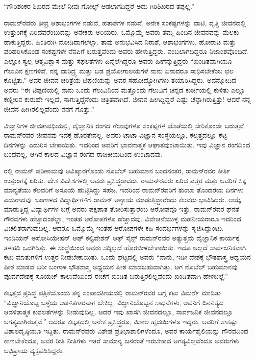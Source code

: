 “ಗೌರಿಶಂಕರ ಶಿಖರದ ಮೇಲೆ ನೀವು ಗೋಲ್ಫ್ ಆಡಲಾಗದಿದ್ದರೆ ಅದು ಗಿರಿಶಿಖರದ ತಪ್ಪಲ್ಲ.”

ರಾಮನ್‍ರವರು ತೀವ್ರ ಆಶಾಭಂಗಗಳ ನಡುವೆ, ಹತಾಶೆಗಳ ನಡುವೆ, ಅನೇಕ ಸಂಕಷ್ಟಗಳನ್ನು ದಾಟಿ, ವೃತ್ತಿ ಜೀವನದಲ್ಲಿ ಉತ್ತುಂಗಕ್ಕೆ ಏರಿದವರೆಂಬುದನ್ನು ಅನೇಕರು ಅರಿಯರು. ಒಮ್ಮೊಮ್ಮೆ ಅವರು ತಮ್ಮ ಹಿಂದಿನ ಜೀವನವನ್ನು ಮೆಲಕು ಹಾಕುತ್ತಿದ್ದರು. ಹಿಂತಿರುಗಿ ನೋಡಿದಾಗಲೆಲ್ಲಾ, ತಾವು ಅನುಭವಿಸಿದ ನಿರಾಶೆ, ಆಶಾಭಂಗಗಳು, ಹೋರಾಟ ಮತ್ತು ಪರಿಹರಿಸಿಕೊಂಡ ಸಂಕಷ್ಟಗಳೇ ನೆನಪಿಗೆ ಬರುತ್ತವೆಂದು ಅವರು ಹೇಳುತ್ತಿದ್ದರು. ನಂಬಲಾಗದಿದ್ದರೂ ನಿಜಾಂಶವೊಂದಿದೆ. ಎಲ್ಲೋ ಸ್ವಲ್ಪ ಆತ್ಮವಿಶ್ವಾಸ ಮತ್ತು ಸಫಲತೆಗಳು ಹಿನ್ನೆಲೆಗಿದ್ದರೂ ಅವರು ಹೀಗೆನ್ನುತ್ತಿದ್ದರು\enginline{-} “ಖಂಡಿತವಾಗಿಯೂ ಗೆಲುವಿನ ಕ್ಷಣಗಳಿವೆ. ನನ್ನ ದಾರಿದ್ರ್ಯ ಮತ್ತು ಬಡ ಪ್ರಯೋಗಾಲಯಗಳೆ ನಾನು ಏನಾದರೂ ಸಾಧಿಸಬೇಕೆಂಬ ಛಲ ಕೊಟ್ಟಿತು.” ಅವರ ಜೀವನ ಚರಿತ್ರೆಯ ಟಿಪ್ಪಣಿಯನ್ನು ಅವರ ಸಹೋದ್ಯೋಗಿ\-ಗಳು ತಯಾರಿಸಿದ್ದರು. ಅದನ್ನೋದಿದ ಅವರು “ಈ ಟಿಪ್ಪಣಿಯಲ್ಲಿ ನಾನು ಒಂದು ಗೆಲುವಿನಿಂದ ಮತ್ತೊಂದು ಗೆಲುವಿಗೆ ಚಿನ್ನದ ಕುರ್ಚಿಯಲ್ಲಿ ಕುಳಿತು ಎಲ್ಲೂ ಕಣ್ಣೀರಿನ ಕುರುಹೇ ಇಲ್ಲದೆ, ಸಾಗುತ್ತಿದ್ದೆ\-ನೆಂದು ಚಿತ್ರಿತವಾಗಿದೆ. ಜೀವನ ಹೀಗಿದ್ದಿದ್ದರೆ ಎಷ್ಟು ಚೆನ್ನಾಗಿರುತ್ತಿತ್ತು! ಆದರೆ ನನ್ನ ಜೀವನ ಹೀಗಿರಲಿಲ್ಲವೆಂದು ನನಗೆ ಗೊತ್ತು.”

ವಿಜ್ಞಾನಿಗಳ ಜೀವತಾವಧಿಯಲ್ಲಿ, ವೈಜ್ಞಾನಿಕ ರಂಗದ ಗೆಲುವುಗಳೂ ಸಂಕಷ್ಟಗಳ ಜೊತೆಯಲ್ಲಿ ಸೇರಿಕೊಂಡೇ ಬರುತ್ತವೆ. ರಾಮನ್‍ರವರ ಜೀವನವು ಇದಕ್ಕೆ ಹೊರತೇನಲ್ಲ. ಅವರು ಟಾಟಾ ವಿಜ್ಞಾನ ಸಂಸ್ಥೆಯಲ್ಲೂ, ಕಲ್ಕತ್ತದಲ್ಲೂ ಕೆಟ್ಟ ದಿನಗಳನ್ನು ಎದುರಿಸ ಬೇಕಾಯಿತು. ಇದರಿಂದ ಅವರಿಗೆ ಭಾವನಾತ್ಮಕ ಆಘಾತವುಂಟಾಯಿತು. ಇವು ವಿಜ್ಞಾನ ರಂಗದಿಂದ ಬಂದವಲ್ಲ, ಆಗಿನ ಕಾಲದ ವಿಜ್ಞಾನ ರಂಗದ ರಾಜಕೀಯದಿಂದ ಉಂಟಾದವು.

ರಲ್ಲಿ ರಾಮನ್ ಪರಿಣಾಮವು ಆವಿಷ್ಕಾರಗೊಂಡು ನೊಬೆಲ್ ಬಹುಮಾನ ಬಂದನಂತರ, ರಾಮನ್‍ರವರ ಕೀರ್ತಿ ಉತ್ತುಂಗಕ್ಕೆ ಏರಿತು. ದೇಶ ವಿದೇಶಗಳಲ್ಲಿ ಅವರು ಪ್ರಸಿದ್ಧರಾದರು. ರಾಮನ್‍ರವರು ಏರಿದ ಎತ್ತರ ಮತ್ತು ಅವರಿಗೆ ಸಿಕ್ಕ ಮಾನ್ಯತೆಯು ಕೆಲವರಿಗೆ ಅಸೂಯೆ ಹುಟ್ಟಿಸಿದ್ದು ಸಹಜ. ಇದರಿಂದ ರಾಮನ್‍ರವರಿಗೆ ತುಂಬಾ ತೊಂದರೆಯ ದಿನಗಳು ಎದುರಾದವು. ಬಂಗಾಳದ ವಿದ್ಯಾರ್ಥಿಗಳಿಗೆ ರಾಮನ್ ಅನ್ಯಾಯ ಮಾಡುತ್ತಿದ್ದಾರೆಂದು ಕೆಲವರು ಭಾವಿಸಿದರು. ಆಯ್ಕೆ ಮಾಡುತ್ತಿದ್ದ ವಿದ್ಯಾರ್ಥಿಗಳ ಬಗ್ಗೆ ಅವರು ಪಕ್ಷಪಾತ ತೋರಿಸುತ್ತಾರೆಂಬ ಆರೋಪವೂ ಇತ್ತು. ರಾಮನ್‍ರವರ ಘನತೆ ಗೌರವಗಳು ಹೆಚ್ಚಾದಂತೆಲ್ಲಾ, ಇಂತಹ ಆರೋಪಗಳೂ ಹೆಚ್ಚಾದವು. ವಿವೇಚನೆ\-ಯುಳ್ಳ ಮಹನೀಯರಾರೂ ಇದರಿಂದ ವಿಚಲಿತರಾಗುವುದಿಲ್ಲ. ಆದರೂ ಒಮ್ಮೊಮ್ಮೆ ಇಂತಹ ಆರೋಪಗಳೇ ಕಹಿ ಸಂದರ್ಭಗಳನ್ನು ಸೃಜಿಸಿದ್ದುಂಟು. ಇಂಡಿಯನ್ ಅಸೋಸಿಯೇಷನ್ ಆಫ್ ಕಲ್ಟಿವೇಶನ್ ಆಫ್ ಸೈನ್ಸ್ ರಾಮನ್‍ರವರ ಅತ್ಯುತ್ತಮ ವೈಜ್ಞಾನಿಕ ಕಾರ್ಯಕ್ಕೆ ತಳಹದಿ ಒದಗಿಸಿತ್ತು. ಈ ಸಂಸ್ಥೆಯಿಂದ ಅವರು ಸದ್ದಿಲ್ಲದೆ ಹೊರಬೀಳಬೇಕಾಯಿತು. ಇದೂ ಅಲ್ಲದೆ ಸಾರ್ವಜನಿಕವಾಗಿ ಕಟು ಮಾತುಗಳಿಗೆ ಉತ್ತರ ನೀಡಬೇಕಾಯಿತು. ಒಂದು ಘಟ್ಟದಲ್ಲಿ ಅವರು “ನಾನು, ಇಡೀ ದೇಶಕ್ಕೆ ಭೌತಶಾಸ್ತ್ರ ಅಧ್ಯಯನ ಪೀಠ ಮಾಡದೆ ಬರೀ ಬಂಗಾಳ ಭೌತಶಾಸ್ತ್ರ ಅಧ್ಯಯನ ಪೀಠ ಮಾಡಬಹುದಾಗಿತ್ತು. ಆಗ ನೊಬೆಲ್ ಬಹುಮಾನವು ಪೂರ್ವದೇಶಕ್ಕೆ ಸೂಯಜ್ ಕಾಲುವೆಯಿಂದ ಈಚೆಗೆ ಖಂಡಿತ ಬರುತ್ತಿರಲಿಲ್ಲವೆಂದು ಖಂಡಿತವಾಗಿ ಹೇಳಬಲ್ಲೆ.”

ಕಲ್ಕತ್ತದ ಪ್ರಸಿದ್ಧ ಪತ್ರಿಕೆಯೊಂದು ತನ್ನ ಸಂಪಾದಕೀಯದಲ್ಲಿ ರಾಮನ್‍ರವರ ಬಗ್ಗೆ ಕಟು ವಿಮರ್ಶೆ ಮಾಡಿತು\enginline{-} “ವಿಜ್ಞಾನಿಯೊಬ್ಬ ಒಳ್ಳೆಯ ಆಡಳಿತಗಾರನಾಗ ಬೇಕಿಲ್ಲ. ವಿಜ್ಞಾನಿಯೊಬ್ಬನ ಸಾಧನೆಗಳು, ಅವನಿಗೆ ದಿನನಿತ್ಯದ ಆಡಳಿತಾತ್ಮಕ ಕುಶಲತೆಗಳನ್ನು ನೀಡುವುದಿಲ್ಲ. ಆದರೆ ಇವು ಖಾಸಗಿ ಜೀವನದಲ್ಲೂ, ಸಾರ್ವಜನಿಕ ಜೀವನದಲ್ಲೂ ಅಗತ್ಯವಾಗಿರುತ್ತವೆ.” ಆದರೂ ಕಲ್ಕತ್ತದಲ್ಲಿ ಅನೇಕ ಪ್ರಸಿದ್ಧರೂ, ವಿಶಾಲ ಹೃದಯಿಗಳೂ ಇದ್ದರು. ಅವರಿಗೆ ಸಾಕಷ್ಟು ವಿಶಾಲದೃಷ್ಠಿಯೂ ಇದ್ದಿತು. ರಾಮನ್‍ರವರು ವಿಶೇಷ ಪ್ರತಿಭಾಶಾಲಿಗಳೆಂದೂ, ಅವರ ಕಾರ್ಯಶೈಲಿಯನ್ನು ಗೌರವದಿಂದ ಕಾಣಬೇಕೆಂದೂ, ಅವರ ರೀತಿ ನೀತಿಗಳು ಇತರೆ ಸಾಮಾನ್ಯ ಜನರಂತೆ ಇರಬೇಕಾದ ಅಗತ್ಯವಿಲ್ಲವೆಂದೂ ಅವರುಗಳು ಅಭಿಪ್ರಾಯ ವ್ಯಕ್ತಪಡಿಸಿದ್ದರು.

